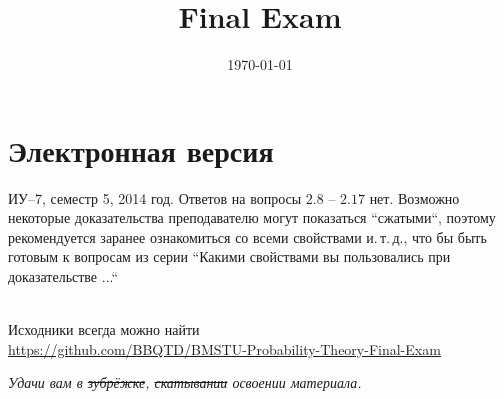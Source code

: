 \documentclass[a4paper,12pt]{article}
\title{Final Exam}
\date{\today}
\begin{document}

\maketitle

\tableofcontents

\newpage

\section*{Электронная версия}

ИУ--7, семестр 5, 2014 год. Ответов на вопросы $2.8$ -- $2.17$ нет. Возможно некоторые доказательства преподавателю могут показаться ``сжатыми``, поэтому рекомендуется заранее ознакомиться со всеми свойствами и.\,т.\,д., что бы быть готовым к вопросам из серии ``Какими свойствами вы пользовались при доказательстве ...``

\hfill\\
\noindent
Исходники всегда можно найти\\ \url{https://github.com/BBQTD/BMSTU-Probability-Theory-Final-Exam}


\begin{flushright}
	\textit{Удачи вам в \sout{зубрёжке}, \sout{скатывании} освоении материала.}
\end{flushright}





\end{document}

